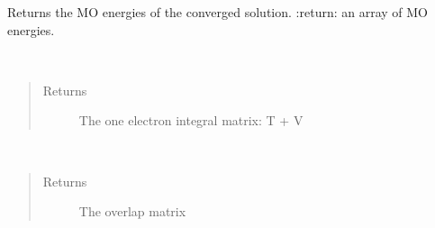 \documentclass[letterpaper,10pt,english]{sphinxmanual}
\begin{document}
\begin{fulllineitems}
\begin{fulllineitems}
\begin{quote}
\begin{description}
\end{description}\end{quote}

\end{fulllineitems}


\begin{fulllineitems}
\label{\detokenize{UHF:hf.HartreeFock.UHF.MF.get_mo_energy}}
Returns the MO energies of the converged solution.
:return: an array of MO energies.

\end{fulllineitems}


\begin{fulllineitems}
\label{\detokenize{UHF:hf.HartreeFock.UHF.MF.get_one_e}}~\begin{quote}\begin{description}
\item[{Returns}] \leavevmode
The one electron integral matrix: T + V

\end{description}\end{quote}

\end{fulllineitems}


\begin{fulllineitems}
\label{\detokenize{UHF:hf.HartreeFock.UHF.MF.get_ovlp}}~\begin{quote}\begin{description}
\item[{Returns}] \leavevmode
The overlap matrix

\end{description}\end{quote}

\end{fulllineitems}



\end{fulllineitems}
\end{document}
